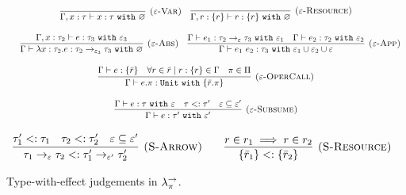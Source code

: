 \begin{figure}[h]


\noindent
{}

\[
\begin{array}{c}

\infer[\textsc{($\varepsilon$-Var)}]
	{ \Gamma, x:\tau \vdash x: \tau~\kw{with} \varnothing }
	{}
	
	~~~
	
\infer[\textsc{($\varepsilon$-Resource)}]
 	{ \Gamma, r: \{ r \} \vdash r : \{ r \}~\kw{with} \varnothing }
 	{} \\[3ex]
 	
 	~~~
	\infer[\textsc{($\varepsilon$-Abs)}]
	{ \Gamma \vdash \lambda x:\tau_2 . e : \tau_2 \rightarrow_{\varepsilon_3} \tau_3~\kw{with} \varnothing }
	{ \Gamma, x: \tau_2 \vdash e: \tau_3~\kw{with} \varepsilon_3 }
	
	~~~
	
\infer[\textsc{($\varepsilon$-App)}]
	{ \Gamma \vdash e_1~e_2 : \tau_3~\kw{with} \varepsilon_1 \cup \varepsilon_2 \cup \varepsilon  }
	{ \Gamma \vdash e_1: \tau_2 \rightarrow_{\varepsilon} \tau_3~\kw{with} \varepsilon_1 & \Gamma \vdash e_2: \tau_2~\kw{with} \varepsilon_2 } \\[3ex]
	
\infer[\textsc{($\varepsilon$-OperCall)}]
	{ \Gamma \vdash e.\pi: \kw{Unit} \kw{with} \{ \bar r.\pi \} }
	{ \Gamma \vdash e: \{ \bar r \} & \forall r \in \bar r \mid r: \{ r \} \in \Gamma & \pi \in \Pi } \\[3ex]

\infer[\textsc{($\varepsilon$-Subsume)}]
	{ \Gamma \vdash e: \tau' ~\kw{with} \varepsilon'}
	{ \Gamma \vdash e: \tau ~\kw{with} \varepsilon & \tau <: \tau' & \varepsilon \subseteq \varepsilon'}
\end{array}
\]


\noindent
{}

\[
\begin{array}{c}

\infer[\textsc{(S-Arrow)}]
	{ \tau_1 \rightarrow_{\varepsilon} \tau_2 <: \tau_1' \rightarrow_{\varepsilon'} \tau_2' }
	{ \tau_1' <: \tau_1 & \tau_2 <: \tau_2' & \varepsilon \subseteq \varepsilon' }
~~~~~~
\infer[\textsc{(S-Resource)}]
	{ \{ \bar r_1 \} <: \{ \bar r_2 \} }
	{ r \in r_1 \implies r \in r_2 }

\end{array}
\]


\vspace{-7pt}
\caption{Type-with-effect judgements in $\lambda^{\rightarrow}_{\pi}$.}
\label{This is the label.}
\end{figure}

